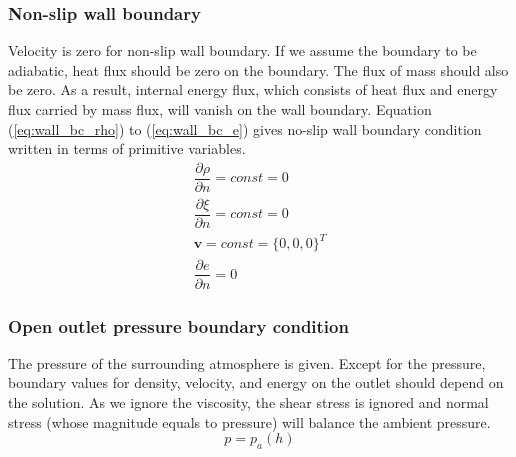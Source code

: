 \documentclass[journal abbreviation, manuscript]{copernicus}
\begin{document}
\subsubsection{Non-slip wall boundary}
Velocity is zero for non-slip wall boundary. If we assume the boundary to be adiabatic, heat flux should be zero on the boundary. The flux of mass should also be zero. As a result, internal energy flux, which consists of heat flux and energy flux carried by mass flux, will vanish on the wall boundary. Equation (\ref{eq:wall_bc_rho}) to (\ref{eq:wall_bc_e}) gives no-slip wall boundary condition written in terms of primitive variables.
\begin{align}
\dfrac{\partial \rho}{\partial n} = const = 0\label{eq:wall_bc_rho} \\
\dfrac{\partial \xi}{\partial n} = const = 0 \label{eq:wall_bc_xi}\\ 
\textbf{v} = const =\{0,0,0\}^T \label{eq:wall_bc_v}\\
\dfrac{\partial e }{\partial n} = 0\label{eq:wall_bc_e}
\end{align} 

\subsubsection{Open outlet pressure boundary condition}
The pressure of the surrounding atmosphere is given. Except for the pressure, boundary values for density, velocity, and energy on the outlet should depend on the solution. As we ignore the viscosity, the shear stress is ignored and normal stress (whose magnitude equals to pressure) will balance the ambient pressure.
\begin{equation}
p = p_a(h)\label{eq:pressure_bc_p} 
\end{equation} 
\end{document}
